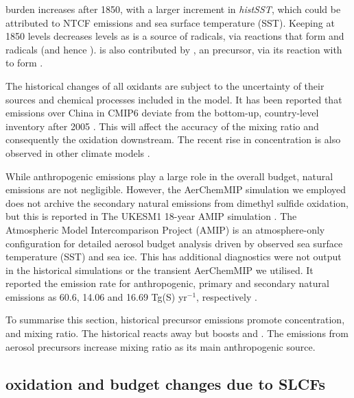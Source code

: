  burden increases after 1850, with a larger increment in \textit{histSST}, which could be attributed to NTCF emissions and sea surface temperature (SST). Keeping  at 1850 levels decreases  levels as  is a source of  radicals, via reactions that form  and  radicals (and hence ).  is also contributed by , an  precursor, via its reaction with  to form . 


The historical changes of all oxidants are subject to the uncertainty of their sources and chemical processes included in the model. It has been reported that  emissions over China in CMIP6 deviate from the bottom-up, country-level inventory after 2005 \citep{fanComparisonAnthropogenicEmission2022}. This will affect the accuracy of the  mixing ratio and consequently the oxidation downstream. The recent rise in  concentration is also observed in other climate models \citep{zhaoIntermodelComparisonGlobal2019}. 


While anthropogenic  emissions play a large role in the overall budget, natural emissions are not negligible. However, the AerChemMIP simulation we employed does not archive the secondary natural  emissions from dimethyl sulfide oxidation, but this is reported in The UKESM1 18-year AMIP simulation \citep{mulcahyDescriptionEvaluationAerosol2020}. The Atmospheric Model Intercomparison Project (AMIP) is an atmosphere-only configuration for detailed aerosol budget analysis driven by observed sea surface temperature (SST) and sea ice. This has additional diagnostics were not output in the historical simulations or the transient AerChemMIP we utilised. It reported the emission rate for anthropogenic, primary and secondary natural  emissions as 60.6, 14.06 and 16.69 Tg(S) yr$^{-1}$, respectively \citep{mulcahyDescriptionEvaluationAerosol2020}. 


To summarise this section, historical  precursor emissions promote  concentration,  and  mixing ratio. The historical  reacts away  but boosts  and . The  emissions from aerosol precursors increase  mixing ratio as its main anthropogenic source.

\subsection{ oxidation and budget changes due to SLCFs}

